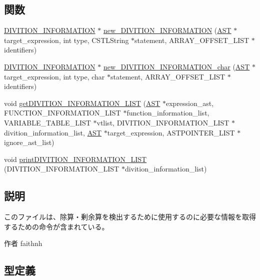 \subsection*{関数}
\begin{DoxyCompactItemize}
\item 
\hyperlink{structdivition__information}{DIVITION\_\-INFORMATION} $\ast$ \hyperlink{DivitionInformation_8h_a996b130740bc8874bbac2794d27bb94c}{new\_\-DIVITION\_\-INFORMATION} (\hyperlink{structabstract__syntax__tree}{AST} $\ast$target\_\-expression, int type, CSTLString $\ast$statement, ARRAY\_\-OFFSET\_\-LIST $\ast$identifiers)
\item 
\hyperlink{structdivition__information}{DIVITION\_\-INFORMATION} $\ast$ \hyperlink{DivitionInformation_8h_a2a58708b942277980a1e342214e8a254}{new\_\-DIVITION\_\-INFORMATION\_\-char} (\hyperlink{structabstract__syntax__tree}{AST} $\ast$target\_\-expression, int type, char $\ast$statement, ARRAY\_\-OFFSET\_\-LIST $\ast$identifiers)
\item 
void \hyperlink{DivitionInformation_8h_a644b8d5eff9ed05458a1fc23e956dec2}{getDIVITION\_\-INFORMATION\_\-LIST} (\hyperlink{structabstract__syntax__tree}{AST} $\ast$expression\_\-ast, FUNCTION\_\-INFORMATION\_\-LIST $\ast$function\_\-information\_\-list, VARIABLE\_\-TABLE\_\-LIST $\ast$vtlist, DIVITION\_\-INFORMATION\_\-LIST $\ast$divition\_\-information\_\-list, \hyperlink{structabstract__syntax__tree}{AST} $\ast$target\_\-expression, ASTPOINTER\_\-LIST $\ast$ignore\_\-ast\_\-list)
\item 
void \hyperlink{DivitionInformation_8h_a74edf6ce59d5bd1990b6d76553b13380}{printDIVITION\_\-INFORMATION\_\-LIST} (DIVITION\_\-INFORMATION\_\-LIST $\ast$divition\_\-information\_\-list)
\end{DoxyCompactItemize}


\subsection{説明}
このファイルは、除算・剰余算を検出するために使用するのに必要な情報を取得するための命令が含まれている。 \begin{DoxyAuthor}{作者}
faithnh 
\end{DoxyAuthor}


\subsection{型定義}
